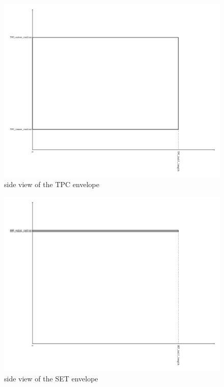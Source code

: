 \documentclass[a4paper]{article}
\begin{document}
\begin{figure}[th]
  \centering
  \includegraphics[width=\columnwidth]{TPC_rz_envelope}
  \caption{side view of the TPC envelope}
  \label{ild:fig:tpc_env_rz}
\end{figure}

\begin{figure}[th]
  \centering
  \includegraphics[width=1.3\columnwidth]{SET_rz_envelope}
  \caption{side view of the SET envelope}
  \label{ild:fig:set_env_rz}
\end{figure}







%
%
\end{document}
